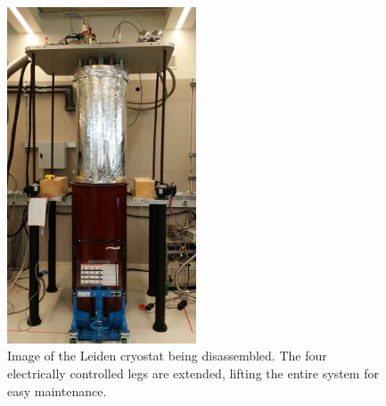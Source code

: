 \begin{figure}
\centering
\includegraphics[angle=-90,width = 0.5\textwidth]{figures/appendix/cryostats/Leiden_opening.jpg}
\caption{Image of the Leiden cryostat being disassembled. The four electrically controlled legs are extended, lifting the entire system for easy maintenance.}
\label{Fig:Appen:Leiden_opening}
\end{figure}

